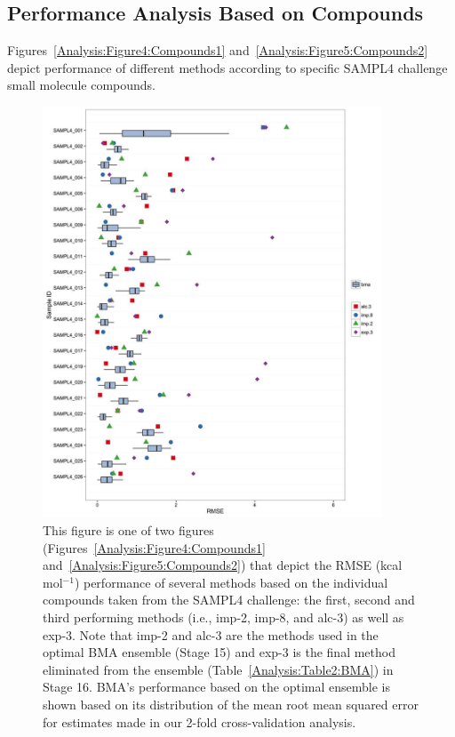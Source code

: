 \documentclass[journal=jpcbfk, manuscript=article]{achemso}
\newcommand{\+}[1]{\ensuremath{\mathbf{#1}}}
\begin{document}
\subsection{Performance Analysis Based on Compounds}
\label{Results:BMA_Molecules}
Figures~\ref{Analysis:Figure4:Compounds1} and~\ref{Analysis:Figure5:Compounds2} depict performance of different methods according to specific SAMPL4 challenge small molecule compounds.
\begin{figure}
	\centering
	\includegraphics[keepaspectratio,width=0.9\textwidth]{Figures/compounds_1}
	\caption{This figure is one of two figures (Figures~\ref{Analysis:Figure4:Compounds1} and~\ref{Analysis:Figure5:Compounds2}) that depict the RMSE (kcal mol$^{-1}$) performance of several methods based on the individual compounds taken from the SAMPL4 challenge: the first, second and third performing methods (i.e., imp-2, imp-8, and alc-3) as well as exp-3.
	Note that imp-2 and alc-3 are the methods used in the optimal BMA ensemble (Stage 15) and exp-3 is the final method eliminated from the ensemble (Table~\ref{Analysis:Table2:BMA}) in Stage 16.
	BMA's performance based on the optimal ensemble is shown based on its distribution of the mean root mean squared error for estimates made in our 2-fold cross-validation analysis.
}
\end{figure}
\end{document}
